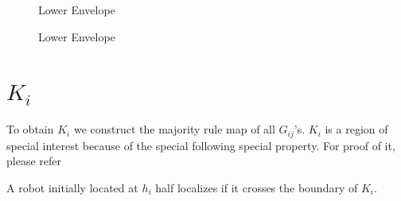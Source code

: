 \begin{figure}
\begin{center}
\caption{\label{fig:Construction}Lower Envelope}
\end{center}
\end{figure}

\begin{figure}
\begin{center}
\caption{\label{fig:Construction}Lower Envelope}
\end{center}
\end{figure}

\section{$K_{i}$}
 To obtain $K_{i}$ we construct the 
majority rule map of all $G_{ij}$'s. $K_{i}$ is a region of special interest because of the special following special property. For 
proof of it, please refer \cite{key1}
\begin{remark} 
 A robot initially located at $h_{i}$ half localizes if it crosses the boundary of $K_{i}$.
\end{remark}
